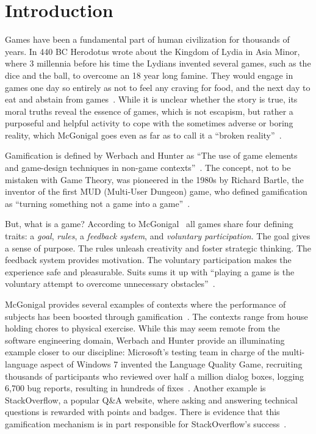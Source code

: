 \section{Introduction}

Games have been a fundamental part of human civilization for thousands of years. In 440 BC Herodotus wrote about the Kingdom of Lydia in Asia Minor, where 3 millennia before his time the Lydians invented several games, such as the dice and the ball, to overcome an 18 year long famine. They would engage in games one day so entirely as not to feel any craving for food, and the next day to eat and abstain from games~\cite{Hero440a}.
 While it is unclear whether the story is true, its moral truths reveal the essence of games, which is not escapism, but rather a purposeful and helpful activity to cope with the sometimes adverse or boring reality, which McGonigal goes even as far as to call it a ``broken reality''~\cite{McGo2011a}. 
 
 Gamification is defined by Werbach and Hunter as ``The use of game elements and game-design techniques in non-game contexts''~\cite{Werb2012a}. The concept, not to be mistaken with Game Theory, was pioneered in the 1980s by Richard Bartle, the inventor of the first MUD (Multi-User Dungeon) game, who defined gamification as ``turning something not a game into a game''~\cite{Bart2003a}.

But, what is a game? According to McGonigal~\cite{McGo2011a} all games share four defining traits: a \emph{goal}, \emph{rules}, a \emph{feedback system}, and \emph{voluntary participation}. The goal gives a sense of purpose. The rules unleash creativity and foster strategic thinking. The feedback system provides motivation. The voluntary participation makes the experience safe and pleasurable. Suits sums it up with ``playing a game is the voluntary attempt to overcome unnecessary obstacles''~\cite{Suit2005a}.

McGonigal provides several examples of contexts where the performance of subjects has been boosted through gamification~\cite{McGo2011a}. The contexts range from house holding chores to physical exercise. While this may seem remote from the software engineering domain, Werbach and Hunter provide an illuminating example closer to our discipline: Microsoft's testing team in charge of the multi-language aspect of Windows 7 invented the Language Quality Game, recruiting thousands of participants who reviewed over half a million dialog boxes, logging 6,700 bug reports, resulting in hundreds of fixes~\cite{Werb2012a}. Another example is StackOverflow, a popular Q\&A website, where asking and answering technical questions is rewarded with points and badges. There is evidence that this gamification mechanism is in part responsible for StackOverflow's success~\cite{Vasil2013a}.

